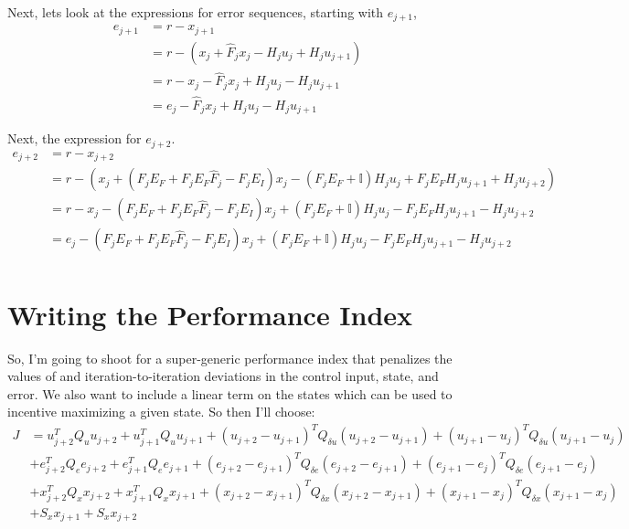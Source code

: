 \documentclass[landscape]{article}
\begin{document}
Next, lets look at the expressions for error sequences, starting with $e_{j+1}$,
\begin{align}
e_{j+1} 
& = r - x_{j+1}\\
& = r - ( x_j + \hat{F}_j x_j - H_j u_j + H_j u_{j+1} ) \\
& = r -  x_j - \hat{F}_j x_j + H_j u_j - H_j u_{j+1} \\
& = e_j - \hat{F}_j x_j + H_j u_j - H_j u_{j+1} 
\end{align}

Next, the expression for $e_{j+2}$.
\begin{align}
e_{j+2} 
& = r - x_{j+2}\\
& = r - \left(x_j + \left(F_j E_F + F_j E_F \hat{F}_j - F_j E_I\right)x_j - \left(F_j E_F +\mathbb{I} \right) H_j u_j + F_j E_F H_j u_{j+1}   + H_j u_{j+2}\right) \\
& = r - x_j - \left(F_j E_F + F_j E_F \hat{F}_j - F_j E_I\right)x_j + \left(F_j E_F +\mathbb{I} \right) H_j u_j - F_j E_F H_j u_{j+1}   - H_j u_{j+2} \\
& = e_j - \left(F_j E_F + F_j E_F \hat{F}_j - F_j E_I\right)x_j + \left(F_j E_F +\mathbb{I} \right) H_j u_j - F_j E_F H_j u_{j+1}   - H_j u_{j+2} \\
\end{align}
\section{Writing the Performance Index}

So, I'm going to shoot for a super-generic performance index that penalizes the values of and iteration-to-iteration deviations in the control input, state, and error.  We also want to include a linear term on the states which can be used to incentive maximizing a given state.  So then I'll choose:
\begin{align}
J &= 
 u_{j+2}^T Q_u u_{j+2} 
 + u_{j+1}^T Q_u u_{j+1} 
 + \left(u_{j+2} - u_{j+1} \right)^T Q_{\delta u} \left(u_{j+2} - u_{j+1} \right) 
 + \left(u_{j+1} - u_{j}   \right)^T Q_{\delta u} \left(u_{j+1} - u_{j}   \right)\\
& + e_{j+2}^T Q_e e_{j+2}
  + e_{j+1}^T Q_e e_{j+1}
  + \left(e_{j+2} - e_{j+1} \right)^T Q_{\delta e} \left(e_{j+2} - e_{j+1} \right) 
  + \left(e_{j+1} - e_{j}   \right)^T Q_{\delta e} \left(e_{j+1} - e_{j}   \right)\\
& + x_{j+2}^T Q_x x_{j+2}
  + x_{j+1}^T Q_x x_{j+1}
  + \left(x_{j+2} - x_{j+1} \right)^T Q_{\delta x} \left(x_{j+2} - x_{j+1} \right) 
  + \left(x_{j+1} - x_{j} \right)^T Q_{\delta x} \left(x_{j+1} - x_{j} \right)\\
& + S_x x_{j+1} + S_x x_{j+2}
\end{align}
\end{document}

